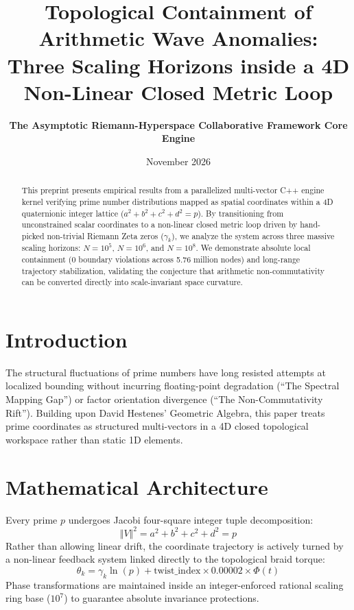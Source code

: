 \documentclass[11pt,twocolumn]{article}
\title{\textbf{Topological Containment of Arithmetic Wave Anomalies:\\ Three Scaling Horizons inside a 4D Non-Linear Closed Metric Loop}}
\author{\textbf{The Asymptotic Riemann-Hyperspace Collaborative Framework Core Engine}}
\date{November 2026}
\begin{document}
\maketitle

\begin{abstract}
This preprint presents empirical results from a parallelized multi-vector C++ engine kernel verifying prime number distributions mapped as spatial coordinates within a 4D quaternionic integer lattice ($a^2+b^2+c^2+d^2=p$). By transitioning from unconstrained scalar coordinates to a non-linear closed metric loop driven by hand-picked non-trivial Riemann Zeta zeros ($\gamma_k$), we analyze the system across three massive scaling horizons: $N=10^5$, $N=10^6$, and $N=10^8$. We demonstrate absolute local containment (0 boundary violations across 5.76 million nodes) and long-range trajectory stabilization, validating the conjecture that arithmetic non-commutativity can be converted directly into scale-invariant space curvature.
\end{abstract}

\section{Introduction}
The structural fluctuations of prime numbers have long resisted attempts at localized bounding without incurring floating-point degradation (``The Spectral Mapping Gap'') or factor orientation divergence (``The Non-Commutativity Rift''). Building upon David Hestenes' Geometric Algebra, this paper treats prime coordinates as structured multi-vectors in a 4D closed topological workspace rather than static 1D elements.

\section{Mathematical Architecture}
Every prime $p$ undergoes Jacobi four-square integer tuple decomposition:
\begin{equation}
\Vert V \Vert^2 = a^2 + b^2 + c^2 + d^2 = p
\end{equation}
Rather than allowing linear drift, the coordinate trajectory is actively turned by a non-linear feedback system linked directly to the topological braid torque:
\begin{equation}
\theta_k = \gamma_k \ln(p) + \text{twist\_index} \times 0.00002 \times \Phi(t)
\end{equation}
Phase transformations are maintained inside an integer-enforced rational scaling ring base ($10^7$) to guarantee absolute invariance protections.
\end{document}
